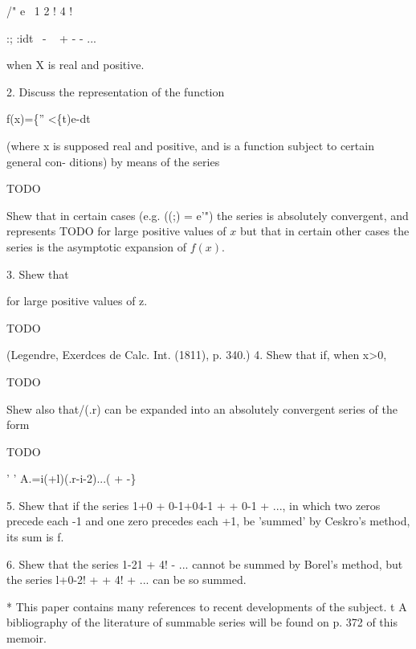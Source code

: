 /" e~ 1 2 ! 4 !

:; :idt~ - ~ + - - ...

when X is real and positive.

2. Discuss the representation of the function

f(x)=\{'' <\{t)e-dt

(where x is supposed real and positive, and is a function subject to
certain general con- ditions) by means of the series

TODO

Shew that in certain cases (e.g. ((;) = e'") the series is
absolutely convergent, and represents TODO for large positive values
of $x$ but that in certain other cases the series is the asymptotic
expansion of $f(x)$.

3. Shew that

for large positive values of z.

TODO

(Legendre, Exerdces de Calc. Int. (1811), p. 340.) 4. Shew that if,
when x>0,

TODO

Shew also that/(.r) can be expanded into an absolutely convergent
series of the form

TODO 

' ' A.=i(+l)(.r-i-2)...( + -\}

5. Shew that if the series 1+0 + 0-1+04-1 + + 0-1 + ..., in which two
zeros precede each -1 and one zero precedes each +1, be 'summed' by
Ceskro's method, its sum is f. 

6. Shew that the series 1-21 + 4! - ... cannot be summed by Borel's
method, but the series l+0-2! + + 4! + ... can be so summed.

* This paper contains many references to recent developments of the
subject. t A bibliography of the literature of summable series will be
found on p. 372 of this memoir.